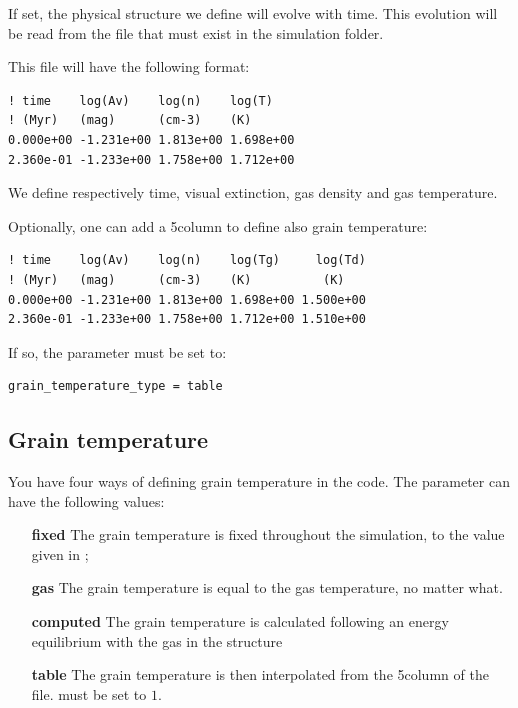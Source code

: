 \documentclass[english,a4paper,twoside]{article}
\begin{document}
If set, the physical structure we define will evolve with time. This evolution will be read from the file  that must exist in the simulation folder. 

This file will have the following format:
\begin{verbatim}
! time    log(Av)    log(n)    log(T)
! (Myr)   (mag)      (cm-3)    (K)
0.000e+00 -1.231e+00 1.813e+00 1.698e+00
2.360e-01 -1.233e+00 1.758e+00 1.712e+00
\end{verbatim}
We define respectively time, visual extinction, gas density and gas temperature. 

Optionally, one can add a 5\th column to define also grain temperature:
\begin{verbatim}
! time    log(Av)    log(n)    log(Tg)     log(Td)
! (Myr)   (mag)      (cm-3)    (K)          (K)
0.000e+00 -1.231e+00 1.813e+00 1.698e+00 1.500e+00
2.360e-01 -1.233e+00 1.758e+00 1.712e+00 1.510e+00
\end{verbatim}
If so, the parameter  must be set to:
\begin{verbatim}
grain_temperature_type = table
\end{verbatim}

\subsection{Grain temperature}
You have four ways of defining grain temperature in the code. The parameter  can have the following values:
\begin{itemize}
\item[\textbf{fixed}] The grain temperature is fixed throughout the simulation, to the value given in  ;
\item[\textbf{gas}] The grain temperature is equal to the gas temperature, no matter what.
\item[\textbf{computed}] The grain temperature is calculated following an energy equilibrium with the gas in the structure
\item[\textbf{table}] The grain temperature is then interpolated from the 5\th column of the   file.  must be set to $1$.
\end{itemize}
\end{document}
